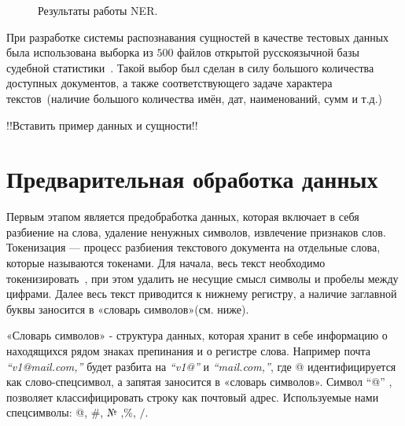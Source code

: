 \documentclass{csmathnotes}
\begin{document}
\begin{figure}[h]
	\caption{Результаты работы NER.}
	\label{fig:ner}
\end{figure}


При разработке системы распознавания сущностей в качестве тестовых данных была использована выборка из $500$ файлов открытой русскоязычной базы судебной статистики~\cite{CourtsData}. Такой выбор был сделан в силу большого количества доступных документов, а также соответствующего задаче характера текстов~(наличие большого количества имён, дат, наименований, сумм и т.д.)


!!Вставить пример данных и сущности!!

\section*{Предварительная обработка данных}
Первым этапом является предобработка данных, которая включает в себя разбиение на слова, удаление ненужных символов, извлечение признаков слов. 
Токенизация — процесс разбиения текстового документа на отдельные слова, которые называются токенами. Для начала, весь текст необходимо токенизировать~\cite{Ner}, при этом удалить не несущие смысл символы и пробелы между цифрами. Далее весь текст приводится к нижнему регистру, а наличие заглавной буквы заносится в «словарь символов»(см. ниже).

«Словарь символов» - структура данных, которая хранит в себе информацию о находящихся рядом знаках препинания и о регистре слова. Например почта \emph{“v1@mail.com,”} будет разбита на \emph{“v1@”} и \emph{“mail.com,”}, где @ идентифицируется как слово-спецсимвол, а запятая заносится в «словарь символов». Символ “@” , позволяет классифицировать строку как почтовый адрес. Используемые нами спецсимволы: @, \#, № ,\%, $/$.
\end{document}
